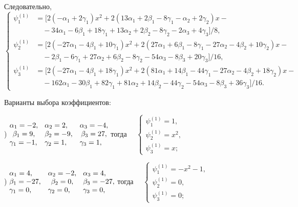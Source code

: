 \documentclass[11pt]{article}
\begin{document}
{Следовательно,
\[
\left\{
\begin{aligned}
\psi_1^{(1)} &= \big[2(- \alpha_1 + 2\gamma_1)x^2 + 2(13\alpha_1 + 2\beta_1 -8\gamma_1 - \alpha_2 + 2\gamma_2)x - \\
&\quad -34\alpha_1 - 6\beta_1 + 18\gamma_1 + 13\alpha_2 + 2\beta_2 - 8\gamma_2 - 2\alpha_3 + 4\gamma_3\big]/8, \\
\psi_2^{(1)} &= \big[2( - 27\alpha_1 - 4\beta_1 + 10\gamma_1)x^2 + 2(27\alpha_1 + 6\beta_1 - 8\gamma_1 - 27\alpha_2 - 4\beta_2 + 10\gamma_2)x - \\
&\quad - 2\beta_1 - 6\gamma_1 + 27\alpha_2 + 6\beta_2 - 8\gamma_2 - 54\alpha_3 - 8\beta_3 + 20\gamma_3\big]/16, \\
\psi_3^{(1)} &= \big[2( - 27\alpha_1 - 4\beta_1 + 18\gamma_1)x^2 + 2(81\alpha_1 + 14\beta_1 - 44\gamma_1 -27\alpha_2 - 4\beta_2 + 18\gamma_2)x - \\
&\quad -162\alpha_1 - 30\beta_1 + 82\gamma_1 + 81\alpha_2 + 14\beta_2 - 44\gamma_2 -54\alpha_3 - 8\beta_3 + 36\gamma_3\big]/16.
\end{aligned}
\right.
\]

Варианты выбора коэффициентов:

) $\begin{matrix} \alpha_1 = -2,\hfill\\ \beta_1 = 9,\\ \gamma_1 = -1,\hfill \end{matrix}$ \
$\begin{matrix} \alpha_2 = 2,\hfill\\ \beta_2 = -9,\\ \gamma_2 = 1,\hfill \end{matrix}$ \
$\begin{matrix} \alpha_3 = -4,\hfill\\ \beta_3 = 27,\\ \gamma_3 = 1,\hfill \end{matrix}$
тогда \ \ $\begin{cases}
\psi_1^{(1)} = 1, \\
\psi_2^{(1)} = x^2, \\
\psi_3^{(1)} = x;
\end{cases}$

) $\begin{matrix} \alpha_1 = 4,\hfill\\ \beta_1 = -27,\\ \gamma_1 = 0,\hfill \end{matrix}$ \
$\begin{matrix} \alpha_2 = -2,\hfill\\ \beta_2 = 0,\\ \gamma_2 = 0,\hfill \end{matrix}$ \
$\begin{matrix} \alpha_3 = 4,\hfill\\ \beta_3 = -27,\\ \gamma_3 = 0,\hfill \end{matrix}$
тогда \ \ $\begin{cases}
\psi_1^{(1)} = -x^2 -1, \\
\psi_2^{(1)} = 0, \\
\psi_3^{(1)} = 0;
\end{cases}$

}
\end{document}
